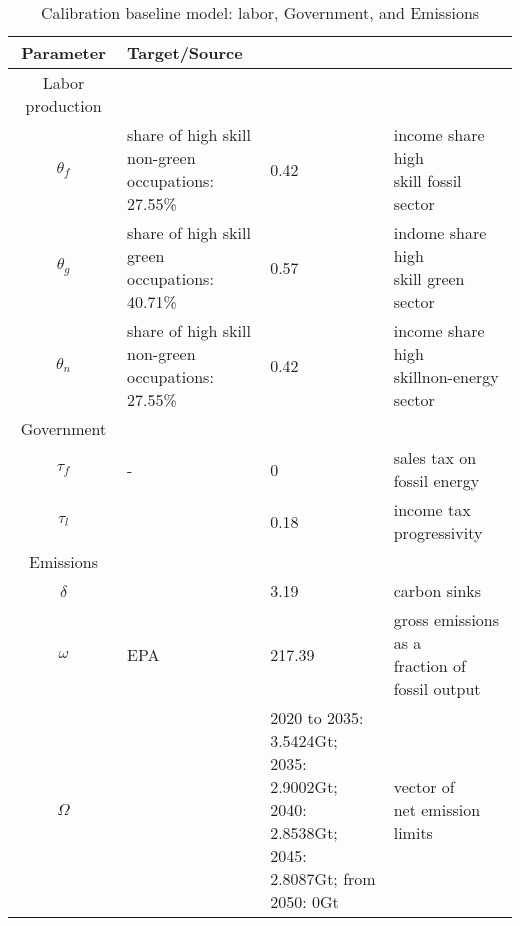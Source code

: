  \begin{table}[hh!!!!!]
 	\begin{center}
 		\captionsetup{width=0.9\textwidth}
 		\caption{ Calibration baseline model: labor, Government, and Emissions}
 		\label{tab:calib2}
 		\begin{tabular}{c|lll}
 			\hline \hline
 			Parameter& Target/Source& \makecell[l]{Calibration}& \makecell[l]{Meaning}\\ 
 			\hline
 			\hline
 			Labor production&\multicolumn{3}{c}{}\\
 			\hline 
 			
 			\hline
 			$\theta_f$&\makecell[l]{share of high skill\\ non-green occupations: \\27.55\% }&0.42&\makecell[l]{income share high \\ skill fossil sector}\\
 			\hline
 			$\theta_g$&\makecell[l]{share of high skill\\ green occupations: \\40.71\% }&0.57&\makecell[l]{indome share high \\skill green sector}\\
 			\hline
 			$\theta_n$&\makecell[l]{share of high skill\\ non-green occupations: \\27.55\% }&0.42&\makecell[l]{income share high \\ skillnon-energy sector}\\
 			\hline
 			\hline
 			Government&\multicolumn{3}{c}{}\\
 			\hline
 			
 			\hline
 			$\tau_f$&- &0& sales tax on fossil energy\\
 			\hline
 			$\tau_l$&\cite{Heathcote2017OptimalFramework} &0.18& income tax progressivity\\
 			\hline	
 			\hline
 			Emissions&\multicolumn{3}{c}{}\\
 			\hline
 			
 			\hline
 			$\delta$& \makecell[l]{EPA}&3.19&carbon sinks \\
 			\hline
 			$\omega$& EPA&217.39& \makecell[l]{ gross emissions as a\\ fraction of fossil output}\\
 			\hline
 			$\Omega$& \cite{IPCC2022}&\makecell[l]{2020 to 2035: 3.5424Gt;\\ 2035: 2.9002Gt; 2040: 2.8538Gt; \\2045: 2.8087Gt; from 2050: 0Gt}& \makecell[l]{vector of \\ net emission limits}\\
 			\hline \hline
 		\end{tabular}
 	\end{center}
 \end{table}
